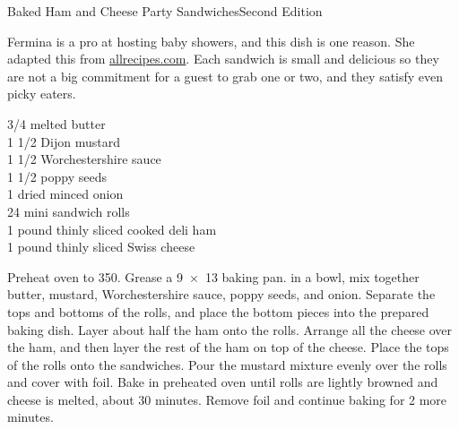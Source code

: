 \begin{entry}{Baked Ham and Cheese Party Sandwiches}{Second Edition}

\begin{open}
  Fermina is a pro at hosting baby showers, and this dish is one reason. She
  adapted this from \url{allrecipes.com}. Each sandwich is small and delicious
  so they are not a big commitment for a guest to grab one or two, and they
  satisfy even picky eaters.
\end{open}
\begin{ingredients}
    \SI{3/4}{\cup} melted butter\\
    1 \SI{1/2}{\tblspoon} Dijon mustard\\
    1 \SI{1/2}{\teaspoon} Worchestershire sauce\\
    1 \SI{1/2}{\tblspoon} poppy seeds\\
    \SI{1}{\tblspoon} dried minced onion\\
    24 mini sandwich rolls\\
    1 pound thinly sliced cooked deli ham\\
    1 pound thinly sliced Swiss cheese
\end{ingredients}
Preheat oven to \SI{350}{\degreeF}. Grease a \SI{9x13}{\inch} baking pan. in a
bowl, mix together butter, mustard, Worchestershire sauce, poppy seeds, and
onion. Separate the tops and bottoms of the rolls, and place the bottom pieces
into the prepared baking dish. Layer about half the ham onto the
rolls. Arrange all the cheese over the ham, and then layer the rest of the ham
on top of the cheese. Place the tops of the rolls onto the sandwiches. Pour
the mustard mixture evenly over the rolls and cover with foil. Bake in
preheated oven until rolls are lightly browned and cheese is melted, about 30
minutes. Remove foil and continue baking for 2 more minutes.
\end{entry}

